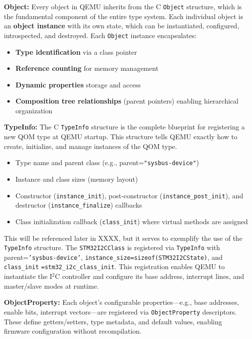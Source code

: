 \textbf{Object:}\cite{Qemu_QOM_API} Every object in QEMU inherits from the C \texttt{Object} structure, which 
is the fundamental component of the entire type system. Each individual object 
is an \textbf{object instance} with its own state, which can be instantiated, configured, 
introspected, and destroyed. Each \texttt{Object} instance encapsulates:

\begin{itemize}
    \item \textbf{Type identification} via a class pointer
    \item \textbf{Reference counting} for memory management
    \item \textbf{Dynamic properties} storage and access
    \item \textbf{Composition tree relationships} (parent pointers) enabling hierarchical 
                                        organization
\end{itemize}

\textbf{TypeInfo:}\cite{Qemu_QOM_API} The C \texttt{TypeInfo} structure is the complete blueprint for registering 
a new QOM type at QEMU startup. This structure tells QEMU exactly how to create, initialize, 
and manage instances of the QOM type.

\begin{itemize}
    \item Type name and parent class (e.g., parent=\texttt{"sysbus-device"})
    \item Instance and class sizes (memory layout)
    \item Constructor (\texttt{instance\_init}), post-constructor (\texttt{instance\_post\_init}), and 
            destructor (\texttt{instance\_finalize}) callbacks
    \item Class initialization callback (\texttt{class\_init}) where virtual methods are assigned
\end{itemize}

This will be referenced later in XXXX, but it serves to exemplify the use of 
the \texttt{TypeInfo} structure. The \texttt{STM32I2CClass} is registered via \texttt{TypeInfo} with 
parent=\texttt{'sysbus-device'}, \texttt{instance\_size=sizeof(STM32I2CState)}, and 
\texttt{class\_init} \texttt{=stm32\_i2c\_class\_init}. This registration enables QEMU to instantiate the I$^2$C 
controller and configure its base address, interrupt lines, and master/slave modes at 
runtime.

\textbf{ObjectProperty:}\cite{Qemu_QOM_API} Each object's configurable properties—e.g., base addresses, 
enable bits, interrupt vectors—are registered via \texttt{ObjectProperty} descriptors. These 
define getters/setters, type metadata, and default values, enabling firmware 
configuration without recompilation.
